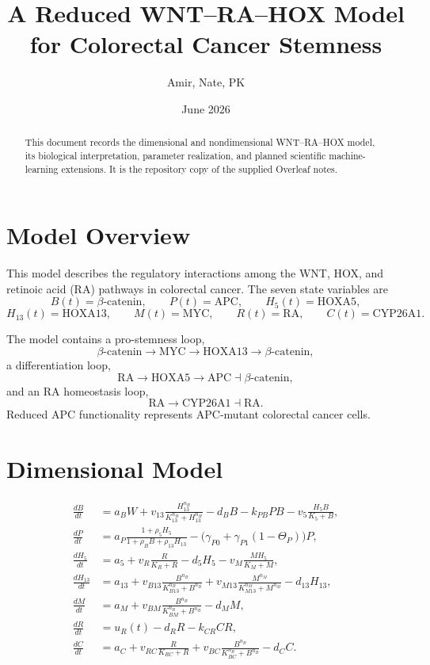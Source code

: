 \documentclass[11pt]{article}
\title{A Reduced WNT--RA--HOX Model for Colorectal Cancer Stemness}
\author{Amir, Nate, PK}
\date{June 2026}
\begin{document}
\maketitle

\begin{abstract}
This document records the dimensional and nondimensional WNT--RA--HOX model,
its biological interpretation, parameter realization, and planned scientific
machine-learning extensions. It is the repository copy of the supplied
Overleaf notes.
\end{abstract}

\section{Model Overview}

This model describes the regulatory interactions among the WNT, HOX, and
retinoic acid (RA) pathways in colorectal cancer. The seven state variables
are
\[
B(t)=\text{$\beta$-catenin},\qquad
P(t)=\text{APC},\qquad
H_5(t)=\text{HOXA5},
\]
\[
H_{13}(t)=\text{HOXA13},\qquad
M(t)=\text{MYC},\qquad
R(t)=\text{RA},\qquad
C(t)=\text{CYP26A1}.
\]

The model contains a pro-stemness loop,
\[
\beta\text{-catenin}\longrightarrow\text{MYC}
\longrightarrow\text{HOXA13}\longrightarrow\beta\text{-catenin},
\]
a differentiation loop,
\[
\text{RA}\longrightarrow\text{HOXA5}\longrightarrow\text{APC}
\dashv\beta\text{-catenin},
\]
and an RA homeostasis loop,
\[
\text{RA}\longrightarrow\text{CYP26A1}\dashv\text{RA}.
\]
Reduced APC functionality represents APC-mutant colorectal cancer cells.

\section{Dimensional Model}

\begin{align}
\frac{dB}{dt}
&=
a_BW
+v_{13}\frac{H_{13}^{n_H}}{K_{13}^{n_H}+H_{13}^{n_H}}
-d_BB-k_{PB}PB-v_5\frac{H_5B}{K_5+B},
\\
\frac{dP}{dt}
&=
a_P\frac{1+\rho_5H_5}{1+\rho_BB+\rho_{13}H_{13}}
-\Big(\gamma_{P0}+\gamma_{P1}(1-\Theta_P)\Big)P,
\\
\frac{dH_5}{dt}
&=
a_5+v_R\frac{R}{K_R+R}-d_5H_5
-v_M\frac{MH_5}{K_M+M},
\\
\frac{dH_{13}}{dt}
&=
a_{13}
+v_{B13}\frac{B^{n_B}}{K_{B13}^{n_B}+B^{n_B}}
+v_{M13}\frac{M^{n_M}}{K_{M13}^{n_M}+M^{n_M}}
-d_{13}H_{13},
\\
\frac{dM}{dt}
&=
a_M+v_{BM}\frac{B^{n_B}}{K_{BM}^{n_B}+B^{n_B}}-d_MM,
\\
\frac{dR}{dt}
&=
u_R(t)-d_RR-k_{CR}CR,
\\
\frac{dC}{dt}
&=
a_C+v_{RC}\frac{R}{K_{RC}+R}
+v_{BC}\frac{B^{n_B}}{K_{BC}^{n_B}+B^{n_B}}-d_CC.
\end{align}
\end{document}
